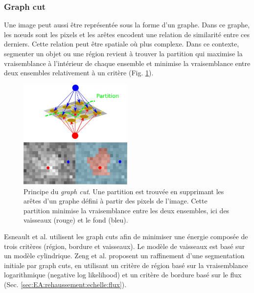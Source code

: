       \subsubsection{Graph cut}
      Une image peut aussi être représentée sous la forme d'un graphe. Dans ce graphe, les nœuds sont les pixels et les arêtes encodent une relation de similarité entre ces derniers. Cette relation peut être spatiale où plus complexe. Dans ce contexte, segmenter un objet ou une région revient à trouver la partition qui maximise la vraisemblance à l'intérieur de chaque ensemble et minimise la vraisemblance entre deux ensembles relativement à un critère (Fig. \ref{fig:graph_cut}).
      \begin{figure}[h]
        \centering
        \includegraphics[width=0.5\textwidth]{Images/graph_cut.png}
        \caption{Principe du \textit{graph cut}. Une partition est trouvée en supprimant les arêtes d'un graphe défini à partir des pixels de l'image. Cette partition minimise la vraisemblance entre les deux ensembles, ici des vaisseaux (rouge) et le fond (bleu). }
        \label{fig:graph_cut}
      \end{figure}
      Esneault et al. \cite{Esneault2009_moments_graph_cut} utilisent les graph cuts afin de minimiser une énergie composée de trois critères (région, bordure et vaisseaux). Le modèle de vaisseaux est basé sur un modèle cylindrique. Zeng et al. \cite{Zeng2017_liver_oof_graph_cut} proposent un raffinement d'une segmentation initiale par graph cuts, en utilisant un critère de région basé sur la vraisemblance logarithmique (negative log likelihood) et un critère de bordure basé sur le flux (Sec. \ref{sec:EA:rehaussement:echelle:flux}).
